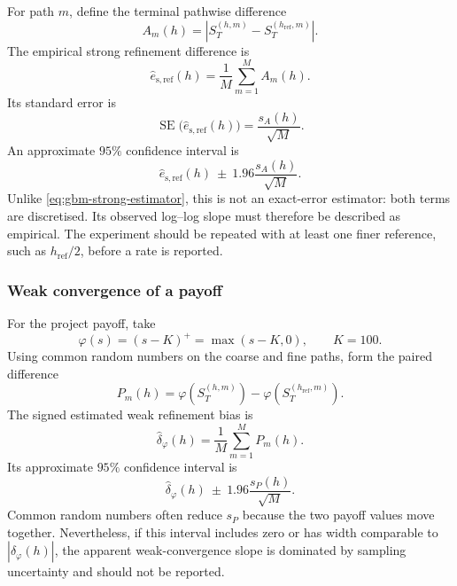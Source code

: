 For path $m$, define the terminal pathwise difference
\begin{equation}
    A_m(h)=\left|S_T^{(h,m)}-S_T^{(h_{\mathrm{ref}},m)}\right|.
    \label{eq:nonaffine-pathwise-difference}
\end{equation}
The empirical strong refinement difference is
\begin{equation}
    \widehat e_{\mathrm{s,ref}}(h)
      =\frac1M\sum_{m=1}^{M}A_m(h).
    \label{eq:nonaffine-strong-estimator}
\end{equation}
Its standard error is
\begin{equation}
    \operatorname{SE}\bigl(\widehat e_{\mathrm{s,ref}}(h)\bigr)
      =\frac{s_A(h)}{\sqrt M}.
    \label{eq:nonaffine-strong-se}
\end{equation}
An approximate $95\%$ confidence interval is
\begin{equation}
    \widehat e_{\mathrm{s,ref}}(h)
      \ \pm\ 1.96\frac{s_A(h)}{\sqrt M}.
    \label{eq:nonaffine-strong-ci}
\end{equation}
Unlike \eqref{eq:gbm-strong-estimator}, this is not an exact-error estimator:
both terms are discretised.  Its observed log--log slope must therefore be
described as empirical.  The experiment should be repeated with at least one
finer reference, such as $h_{\mathrm{ref}}/2$, before a rate is reported.

\subsubsection{Weak convergence of a payoff}

For the project payoff, take
\begin{equation}
    \varphi(s)=(s-K)^+ =\max(s-K,0),
    \qquad K=100.
    \label{eq:call-payoff}
\end{equation}
Using common random numbers on the coarse and fine paths, form the paired
difference
\begin{equation}
    P_m(h)=\varphi(S_T^{(h,m)})
       -\varphi(S_T^{(h_{\mathrm{ref}},m)}).
    \label{eq:nonaffine-payoff-difference}
\end{equation}
The signed estimated weak refinement bias is
\begin{equation}
    \widehat\delta_{\varphi}(h)=\frac1M\sum_{m=1}^{M}P_m(h).
    \label{eq:nonaffine-weak-estimator}
\end{equation}
Its approximate $95\%$ confidence interval is
\begin{equation}
    \widehat\delta_{\varphi}(h)
       \ \pm\ 1.96\frac{s_P(h)}{\sqrt M}.
    \label{eq:nonaffine-weak-ci}
\end{equation}
Common random numbers often reduce $s_P$ because the two payoff values move
together.  Nevertheless, if this interval includes zero or has width
comparable to $|\widehat\delta_{\varphi}(h)|$, the apparent weak-convergence
slope is dominated by sampling uncertainty and should not be reported.

